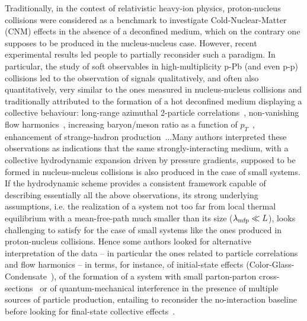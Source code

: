 Traditionally, in the contest of relativistic heavy-ion physics, proton-nucleus collisions were considered as a benchmark to investigate Cold-Nuclear-Matter (CNM) effects in the absence of a deconfined medium, which on the contrary one supposes to be produced in the nucleus-nucleus case. However, recent experimental results led people to partially reconsider such a paradigm. 
In particular, the study of soft observables in high-multiplicity p-Pb (and even p-p) collisions led to the observation of signals qualitatively, and often also quantitatively, very similar to the ones measured in nucleus-nucleus collisions and traditionally attributed to the formation of a hot deconfined medium displaying a collective behaviour: long-range azimuthal 2-particle correlations~\cite{Khachatryan:2010gv,CMS:2012qk,Abelev:2012ola,Aad:2012gla}, non-vanishing flow harmonics~\cite{ABELEV:2013wsa,Khachatryan:2015waa}, increasing baryon/meson ratio as a function of $p_T$~\cite{Abelev:2013haa}, enhancement of strange-hadron production~\cite{Adam:2015vsf}...Many authors interpreted these observations as indications that the same strongly-interacting medium, with a collective hydrodynamic expansion driven by pressure gradients, supposed to be formed in nucleus-nucleus collisions is also produced in the case of small systems. If the hydrodynamic scheme provides a consistent framework capable of describing essentially all the above observations, its strong underlying assumptions, i.e. the realization of a system not too far from local thermal equilibrium with a mean-free-path much smaller than its size ($\lambda_{\rm mfp}\ll L$), looks challenging to satisfy for the case of small systems like the ones produced in proton-nucleus collisions. Hence some authors looked for alternative interpretation of the data -- in particular the ones related to particle correlations and flow harmonics -- in terms, for instance, of initial-state effects (Color-Glass-Condensate~\cite{Dusling:2013qoz}), of the formation of a system with small parton-parton cross-sections~\cite{Bzdak:2014dia} or of quantum-mechanical interference in the presence of multiple sources of particle production, entailing to reconsider the no-interaction baseline before looking for final-state collective effects~\cite{Blok:2017pui}.

